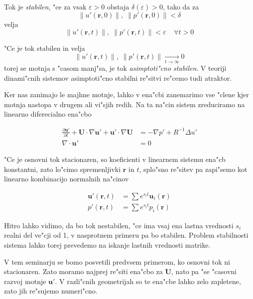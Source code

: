 \documentclass[a4paper,10pt]{article}
\renewcommand{\vec}{\mathbf}
\newcommand{\eps}{\varepsilon}
\newcommand{\norm}[1]{\lVert #1 \rVert}
\newcommand{\rt}{(\vec r, t)}
\begin{document}
Tok je \emph{stabilen}, "ce za vsak $\eps > 0$ obstaja $\delta(\eps) > 0$, tako da za 
\begin{equation}
 \norm{ u'(\vec r, 0) }, \; \norm{ p'(\vec r, 0) } < \delta
\end{equation}
velja
\begin{equation}
 \norm{ u'\rt }, \; \norm{ p'\rt } < \eps \;\;\;\; \forall t > 0
\end{equation}

"Ce je tok stabilen in velja
\begin{equation}
 \norm{u'\rt}, \; \norm{p'\rt} \xrightarrow[t\to\infty]{} 0
\end{equation}
torej se motnja s "casom manj"sa, je tok \emph{asimptoti"cno stabilen}. V teoriji dinami"cnih sistemov asimptoti"cno stabilni re"sitvi re"cemo tudi atraktor. 

Ker nas zanimajo le majhne motnje, lahko v ena"cbi zanemarimo vse "clene kjer motnja nastopa v drugem ali vi"sjih redih. Na ta na"cin sistem zreduciramo na linearno diferecialno ena"cbo 

\begin{align}
 \label{eq:ns-linearna}
\frac{\partial \vec u'}{\partial t} + \vec U \cdot \nabla \vec u' + \vec u' \cdot \nabla \vec U &= -\nabla p' + R^{-1}\Delta u' \\
\label{eq:nestisljivost-linearna}
\nabla \cdot \vec u' &= 0
\end{align}

"Ce je osnovni tok stacionaren, so koeficienti v linearnem sistemu ena"cb konstantni, zato lo"cimo spremenljivki $\vec r$ in $t$, splo"sno re"sitev pa zapi"semo kot linearno kombinacijo normalnih na"cinov 

\begin{align}
 \vec u'\rt &= \sum e^{s_i t} \vec u_i(\vec r) \\
 p'\rt &= \sum e^{s_i t} p_i(\vec r)
\end{align}

Hitro lahko vidimo, da bo tok nestabilen, "ce ima vsaj ena lastna vrednosti $s_i$ realni del ve"cji od 1, v nasprotnem primeru pa bo stabilen. Problem stabilnosti sistema lahko torej prevedemo na iskanje lastnih vrednosti matrike. 

V tem seminarju se bomo posvetili predvsem primerom, ko osnovni tok ni stacionaren. Zato moramo najprej re"siti ena"cbo za $\vec U$, nato pa "se "casovni razvoj motnje $\vec u'$. V razli"cnih geometrijah so te ena"cbe lahko zelo zapletene, zato jih re"sujemo numeri"cno. 
\end{document}
